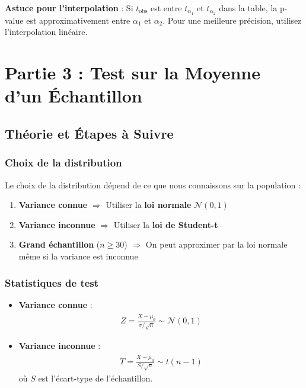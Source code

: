 \documentclass[11pt,a4paper]{article}
\newcommand{\N}{\mathcal{N}}
\begin{document}
\begin{astucebox}
\textbf{Astuce pour l'interpolation} : Si $t_{\text{obs}}$ est entre $t_{\alpha_1}$ et $t_{\alpha_2}$ dans la table, la p-value est approximativement entre $\alpha_1$ et $\alpha_2$. Pour une meilleure précision, utilisez l'interpolation linéaire.
\end{astucebox}

\newpage

\section{Partie 3 : Test sur la Moyenne d'un Échantillon}

\subsection{Théorie et Étapes à Suivre}

\subsubsection{Choix de la distribution}

Le choix de la distribution dépend de ce que nous connaissons sur la population :

\begin{enumerate}
    \item \textbf{Variance connue} $\Rightarrow$ Utiliser la \textbf{loi normale} $\N(0,1)$
    \item \textbf{Variance inconnue} $\Rightarrow$ Utiliser la \textbf{loi de Student-t}
    \item \textbf{Grand échantillon} ($n \geq 30$) $\Rightarrow$ On peut approximer par la loi normale même si la variance est inconnue
\end{enumerate}

\subsubsection{Statistiques de test}

\begin{itemize}
    \item \textbf{Variance connue} :
    \begin{align*}
    Z = \frac{\bar{X} - \mu_0}{\sigma/\sqrt{n}} \sim \N(0,1)
    \end{align*}
    
    \item \textbf{Variance inconnue} :
    \begin{align*}
    T = \frac{\bar{X} - \mu_0}{S/\sqrt{n}} \sim t(n-1)
    \end{align*}
    où $S$ est l'écart-type de l'échantillon.
\end{itemize}
\end{document}
